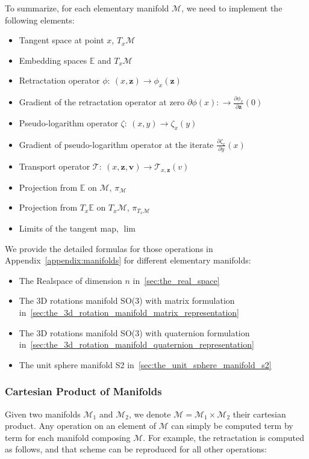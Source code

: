 To summarize, for each elementary manifold $\mathcal{M}$, we need to implement the following elements:
\begin{itemize}
  \item Tangent space at point $x$, $T_x\mathcal{M}$
  \item Embedding spaces $\mathbb{E}$ and $T_x\mathcal{M}$
  \item Retractation operator $\phi:\ (x,\mathbf{z}) \rightarrow \phi_x(\mathbf{z})$
  \item Gradient of the retractation operator at zero $\partial \phi(x):\rightarrow \frac{\partial \phi_x}{\partial \mathbf{z}}(0)$
  \item Pseudo-logarithm operator $\zeta:\ (x,y) \rightarrow \zeta_x(y)$
  \item Gradient of pseudo-logarithm operator at the iterate $\frac{\partial \zeta_x}{\partial y}(x)$
  \item Transport operator $\mathcal{T}:\ (x,\mathbf{z}, \mathbf{v})\rightarrow \mathcal{T}_{x,\mathbf{z}}(v)$
  \item Projection from $\mathbb{E}$ on $\mathcal{M}$, $\pi_\mathcal{M}$
  \item Projection from $T_x\mathbb{E}$ on $T_x\mathcal{M}$, $\pi_{T_x\mathcal{M}}$
  \item Limits of the tangent map, $\lim$
\end{itemize}

We provide the detailed formulas for those operations in Appendix~\ref{appendix:manifolds} for different elementary manifolds:
\begin{itemize}
  \item The Realspace of dimension $n$ in~\ref{sec:the_real_space}
  \item The 3D rotations manifold SO(3) with matrix formulation in~\ref{sec:the_3d_rotation_manifold_matrix_representation}
  \item The 3D rotations manifold SO(3) with quaternion formulation in~\ref{sec:the_3d_rotation_manifold_quaternion_representation}
  \item The unit sphere manifold S2 in~\ref{sec:the_unit_sphere_manifold_s2}
\end{itemize}

\subsubsection{Cartesian Product of Manifolds}
\label{ssub:cartesian_product_of_manifolds}
Given two manifolds $\mathcal{M}_1$ and $\mathcal{M}_2$, we denote $\mathcal{M}=\mathcal{M}_1\times\mathcal{M}_2$ their cartesian product.
Any operation on an element of $\mathcal{M}$ can simply be computed term by term for each manifold composing $\mathcal{M}$.
For example, the retractation is computed as follows, and that scheme can be reproduced for all other operations:

